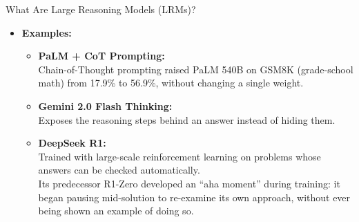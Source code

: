 \begin{frame}[allowframebreaks]{What Are Large Reasoning Models (LRMs)?}
\begin{itemize}
\begin{itemize}
            \item More decode steps spent on a hard question than an easy one
            \item Better performance on symbolic tasks and math
            \item Often paired with advanced prompting or finetuning
        \end{itemize}
    \framebreak
        \item \textbf{Examples:}
        \begin{itemize}
            \setlength{\itemsep}{0.5em} 
            \item \textbf{PaLM + CoT Prompting:} \\
                Chain-of-Thought prompting raised PaLM 540B on GSM8K (grade-school math) from 17.9\% to 56.9\%, without changing a single weight.
            \item \textbf{Gemini 2.0 Flash Thinking:} \\
                Exposes the reasoning steps behind an answer instead of hiding them.
            \item \textbf{DeepSeek R1:} \\
                Trained with large-scale reinforcement learning on problems whose answers can be checked automatically. \\
                Its predecessor R1-Zero developed an ``aha moment'' during training: it began pausing mid-solution to re-examine its own approach, without ever being shown an example of doing so.
        \end{itemize}
    \end{itemize}

\end{frame}

